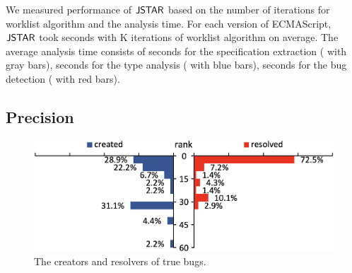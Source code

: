 We measured performance of $\tool$ based on the number of iterations for
worklist algorithm and the analysis time.  For each version of ECMAScript,
$\tool$ took  seconds with K iterations of worklist
algorithm on average.  The average analysis time consists of  seconds
for the specification extraction ( with gray bars),
 seconds for the type analysis ( with blue bars),
 seconds for the bug detection ( with red bars).


\subsection{Precision}\label{sec:precision}

\begin{figure}
  \centering
  \includegraphics[width=\columnwidth]{img/author}
  \caption{The creators and resolvers of true bugs.}
  \label{fig:author}
  \vspace*{-1.5em}
\end{figure}

